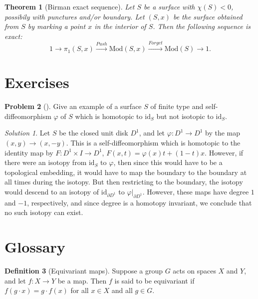\documentclass[reqno]{amsart}
\newtheorem{theorem}{Theorem}[section]
\theoremstyle{definition}
\newtheorem{definition}[theorem]{Definition}
\newtheorem{problem}[theorem]{Problem}
\theoremstyle{remark}
\newtheorem*{solution}{Solution}
\newcommand{\id}{{\mathrm{id}}}
\newcommand{\Mod}{{\mathrm{Mod}}}
\begin{document}
 \begin{theorem}[Birman exact sequence]
     Let $S$ be a surface with $\chi (S) < 0$, possibily
     with punctures and/or boundary. Let
     $\left( S, x \right) $ be the surface
     obtained from $S$ by marking a point $x$ in
     the interior of $S$. Then the following
     sequence is exact:
     \[
         1 \to \pi_1 \left( S, x \right) \stackrel{Push}{\to }
         \Mod \left( S, x \right) 
         \stackrel{Forget}{\to } \Mod(S) \to 1.
     \] 
 \end{theorem}



\newpage

\section{Exercises}

\begin{problem}[]
    Give an example of a surface $S$ of finite type and
    self-diffeomorphism $\varphi $ of $S$ which is
    homotopic to $\id_S$ but not isotopic to $\id_S$.
\end{problem}

\begin{solution}
    Let $S$ be the closed
    unit disk $D^{1}$, and let $\varphi \colon D^{1} \to D^{1}$
    by the map $\left( x,y \right) \to (x,-y)$.
    This is a self-diffeomorphism which is homotopic to
    the identity map by
    $F \colon D^{1} \times I \to D^{1}$,
    $F(x,t) = \varphi(x) t + (1-t)x$. However,
    if there were an isotopy from $\id_S$ to 
    $\varphi$, then since this would have to be a topological embedding, it
    would have to map the boundary to the boundary at all
    times during the isotopy. But then restricting to the boundary,
    the isotopy would descend to an isotopy of
     $\id_{\partial D^{1}}$ to $\varphi|_{\partial D^{1}}$.
     However, these maps have degree $1$ and $-1$, respectively,
     and since degree is a homotopy invariant,
     we conclude that no such isotopy can exist.
\end{solution}




\newpage

\section{Glossary}

\begin{definition}[Equivariant maps]
    Suppose a group $G$ acts on spaces $X$ and $Y$, and let $f \colon X
    \to Y$ be a map. Then  $f$ is said to be equivariant if
    $f (g \cdot x) = g \cdot  f(x)$ for all $x \in X$ and all $g \in G$.
\end{definition}
\end{document}
